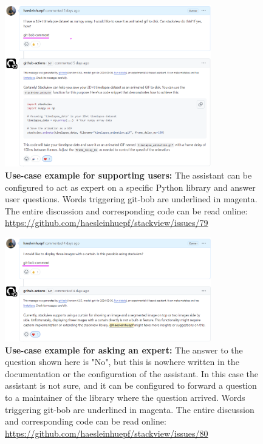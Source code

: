 \documentclass[sn-mathphys-num]{sn-jnl}%
\theoremstyle{thmstyleone}%
\theoremstyle{thmstyletwo}%
\theoremstyle{thmstylethree}%
\begin{document}
\begin{appendices}
\begin{figure}[h]
\centering
\includegraphics[width=0.8\textwidth]{example_supporting_users.png}
\caption{\textbf{Use-case example for supporting users:} The assistant can be configured to act as expert on a specific Python library and answer user questions. Words triggering git-bob are underlined in magenta. The entire discussion and corresponding code can be read online: \url{https://github.com/haesleinhuepf/stackview/issues/79}
\newline
\newline
}
\label{fig:examplesupportingusers}
\end{figure}


\begin{figure}[h]
\centering
\includegraphics[width=0.8\textwidth]{example_supporting_users2.png}
\caption{\textbf{Use-case example for asking an expert:} The answer to the question shown here is "No", but this is nowhere written in the documentation or the configuration of the assistant. In this case the assistant is not sure, and it can be configured to forward a question to a maintainer of the library where the question arrived. Words triggering git-bob are underlined in magenta. The entire discussion and corresponding code can be read online: \url{https://github.com/haesleinhuepf/stackview/issues/80}
\newline
\newline
}
\label{fig:examplesupportingusers2}
\end{figure}




\end{appendices}
\end{document}
